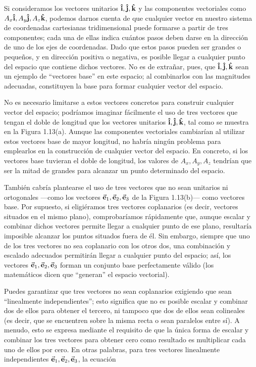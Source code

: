 \documentclass[hidelinks,12pt]{article}
\begin{document}
Si consideramos los vectores unitarios $\vu{i}, \vu{j}, \vu{k}$ y las componentes vectoriales como  $A_{x} \vu{i}, A_{y} \vu{j}, A_{z} \vu{k}$, podemos darnos cuenta de que cualquier vector en nuestro sistema de coordenadas cartesianas tridimensional puede formarse a partir de tres componentes; cada una de ellas indica cuántos pasos deben darse en la dirección de uno de los ejes de coordenadas. Dado que estos pasos pueden ser grandes o pequeños, y en dirección positiva o negativa, es posible llegar a cualquier punto del espacio que contiene dichos vectores. No es de extrañar, pues, que $\vu{i}, \vu{j}, \vu{k}$ sean un ejemplo de \enquote{vectores base} en este espacio; al combinarlos con las magnitudes adecuadas, constituyen la base para formar cualquier vector del espacio.
\par
No es necesario limitarse a estos vectores concretos para construir cualquier vector del espacio; podríamos imaginar fácilmente el uso de tres vectores que tengan el doble de longitud que los vectores unitarios $\vu{i}, \vu{j}, \vu{k}$, tal como se muestra en la Figura 1.13(a). Aunque las componentes vectoriales cambiarían al utilizar estos vectores base de mayor longitud, no habría ningún problema para emplearlos en la construcción de cualquier vector del espacio. En concreto, si los vectores base tuvieran el doble de longitud, los valores de $A_{x}, A_{y}, A_{z}$ tendrían que ser la mitad de grandes para alcanzar un punto determinado del espacio.
\par
También cabría plantearse el uso de tres vectores que no sean unitarios ni ortogonales —como los vectores $\va{e}_{1}, \va{e}_{2}, \va{e}_{3}$ de la Figura 1.13(b)— como vectores base. Por supuesto, si eligiéramos tres vectores coplanarios (es decir, vectores situados en el mismo plano), comprobaríamos rápidamente que, aunque escalar y combinar dichos vectores permite llegar a cualquier punto de ese plano, resultaría imposible alcanzar los puntos situados fuera de él. Sin embargo, siempre que uno de los tres vectores no sea coplanario con los otros dos, una combinación y escalado adecuados permitirán llegar a cualquier punto del espacio; así, los vectores $\va{e}_{1}, \va{e}_{2}, \va{e}_{3}$ forman un conjunto base perfectamente válido (los matemáticos dicen que \enquote{generan} el espacio vectorial).
\par
Puedes garantizar que tres vectores no sean coplanarios exigiendo que sean \enquote{linealmente independientes}; esto significa que no es posible escalar y combinar dos de ellos para obtener el tercero, ni tampoco que dos de ellos sean colineales (es decir, que se encuentren sobre la misma recta o sean paralelos entre sí). A menudo, esto se expresa mediante el requisito de que la única forma de escalar y combinar los tres vectores para obtener cero como resultado es multiplicar cada uno de ellos por cero. En otras palabras, para tres vectores linealmente independientes $\va{e}_{1}, \va{e}_{2}, \va{e}_{3}$, la ecuación
\end{document}
